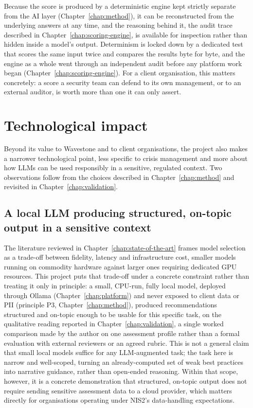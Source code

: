 Because the score is produced by a deterministic engine kept strictly separate from the AI layer (Chapter~\ref{chap:method}), it can be reconstructed from the underlying answers at any time, and the reasoning behind it, the audit trace described in Chapter~\ref{chap:scoring-engine}, is available for inspection rather than hidden inside a model's output. Determinism is locked down by a dedicated test that scores the same input twice and compares the results byte for byte, and the engine as a whole went through an independent audit before any platform work began (Chapter~\ref{chap:scoring-engine}). For a client organisation, this matters concretely: a score a security team can defend to its own management, or to an external auditor, is worth more than one it can only assert.

\section{Technological impact}
\label{sec:impact-technological}

Beyond its value to Wavestone and to client organisations, the project also makes a narrower technological point, less specific to crisis management and more about how LLMs can be used responsibly in a sensitive, regulated context. Two observations follow from the choices described in Chapter~\ref{chap:method} and revisited in Chapter~\ref{chap:validation}.

\subsection{A local LLM producing structured, on-topic output in a sensitive context}
\label{sec:impact-technological-local-llm}

The literature reviewed in Chapter~\ref{chap:state-of-the-art} frames model selection as a trade-off between fidelity, latency and infrastructure cost, smaller models running on commodity hardware against larger ones requiring dedicated GPU resources. This project puts that trade-off under a concrete constraint rather than treating it only in principle: a small, CPU-run, fully local model, deployed through Ollama (Chapter~\ref{chap:platform}) and never exposed to client data or PII (principle P3, Chapter~\ref{chap:method}), produced recommendations structured and on-topic enough to be usable for this specific task, on the qualitative reading reported in Chapter~\ref{chap:validation}, a single worked comparison made by the author on one assessment profile rather than a formal evaluation with external reviewers or an agreed rubric. This is not a general claim that small local models suffice for any LLM-augmented task; the task here is narrow and well-scoped, turning an already-computed set of weak best practices into narrative guidance, rather than open-ended reasoning. Within that scope, however, it is a concrete demonstration that structured, on-topic output does not require sending sensitive assessment data to a cloud provider, which matters directly for organisations operating under NIS2's data-handling expectations.

